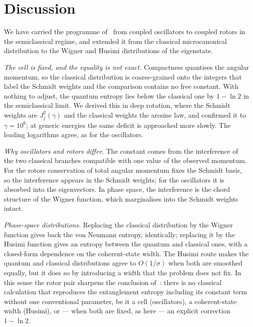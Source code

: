 \documentclass[preprint,12pt]{elsarticle}
\begin{document}
\section{Discussion}
\label{sec:disc}

We have carried the programme of~\cite{DKS} from coupled oscillators to coupled
rotors in the semiclassical regime, and extended it from the classical
microcanonical distribution to the Wigner and Husimi distributions of the
eigenstate.

\emph{The cell is fixed, and the equality is not exact.} Compactness quantises
the angular momentum, so the classical distribution is coarse-grained onto the
integers that label the Schmidt weights and the comparison contains no free
constant. With nothing to adjust, the quantum entropy lies below the classical
one by $1-\ln2$ in the semiclassical limit. We derived this in deep rotation,
where the Schmidt weights are $J_{j}^{2}(\gamma)$ and the classical weights the
arcsine law, and confirmed it to $\gamma=10^{6}$; at generic energies the same
deficit is approached more slowly. The leading logarithms agree, as for the
oscillators.

\emph{Why oscillators and rotors differ.} The constant comes from the
interference of the two classical branches compatible with one value of the
observed momentum. For the rotors conservation of total angular momentum fixes
the Schmidt basis, so the interference appears in the Schmidt weights; for the
oscillators it is absorbed into the eigenvectors. In phase space, the
interference is the chord structure of the Wigner function, which marginalises
into the Schmidt weights intact.

\emph{Phase-space distributions.} Replacing the classical distribution by the
Wigner function gives back the von Neumann entropy, identically; replacing it by
the Husimi function gives an entropy between the quantum and classical ones,
with a closed-form dependence on the coherent-state width. The Husimi route
makes the quantum and classical distributions agree to $O(1/\sigma)$ when both
are smoothed equally, but it does so by introducing a width that the problem
does not fix. In this sense the rotor pair sharpens the conclusion of~\cite{DKS}:
there is no classical calculation that reproduces the entanglement entropy
including its constant term without one conventional parameter, be it a cell
(oscillators), a coherent-state width (Husimi), or --- when both are fixed, as
here --- an explicit correction $1-\ln2$.
\end{document}
